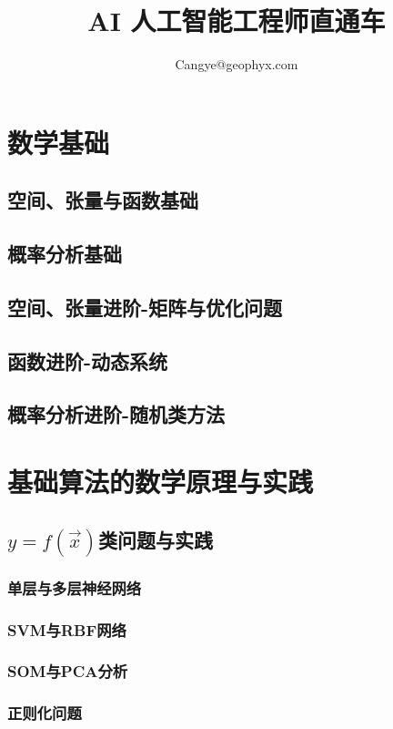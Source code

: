 \documentclass[UTF8]{article}
\author{Cangye@geophyx.com}
\date{}
\title{AI 人工智能工程师直通车}
\begin{document}
    \maketitle
    \tableofcontents

	\section{数学基础}
		\subsection{空间、张量与函数基础}

		\subsection{概率分析基础}

		\subsection{空间、张量进阶-矩阵与优化问题}

		\subsection{函数进阶-动态系统}

                \subsection{概率分析进阶-随机类方法}

	\section{基础算法的数学原理与实践}
		\subsection{$y=f(\vec{x})$类问题与实践}
			\subsubsection{单层与多层神经网络}

			\subsubsection{SVM与RBF网络}

			\subsubsection{SOM与PCA分析}

			\subsubsection{正则化问题}

\end{document}

